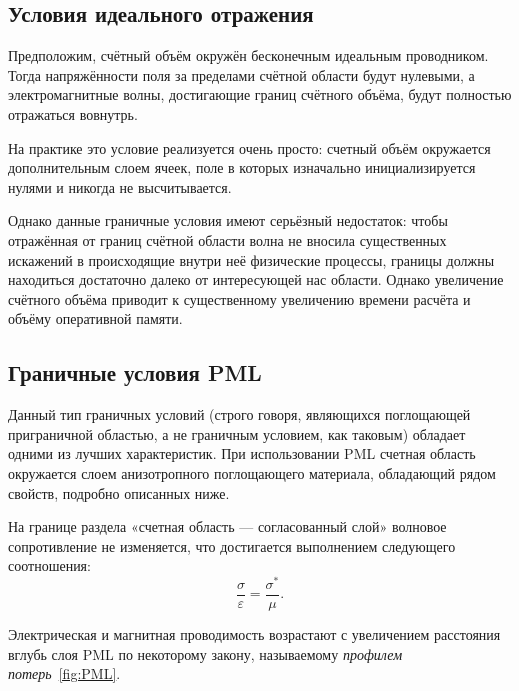 \subsection{Условия идеального отражения}

Предположим, счётный объём окружён бесконечным идеальным проводником. Тогда 
напряжённости поля за пределами счётной области будут нулевыми, а 
электромагнитные волны, достигающие границ счётного объёма, будут полностью отражаться вовнутрь.

На практике это условие реализуется очень просто: счетный объём окружается
дополнительным слоем ячеек, поле в которых изначально
инициализируется нулями и никогда не высчитывается.

Однако данные граничные условия имеют серьёзный недостаток: чтобы отражённая от 
границ счётной области волна не вносила существенных искажений в происходящие внутри неё физические процессы, границы должны находиться достаточно далеко от интересующей нас области. Однако увеличение счётного объёма приводит к 
существенному увеличению времени расчёта и объёму оперативной памяти.

\subsection{Граничные условия PML}

Данный тип граничных условий (строго говоря, являющихся поглощающей приграничной областью, а не граничным условием, как таковым) обладает одними из лучших
характеристик. При использовании PML счетная область
окружается слоем анизотропного поглощающего материала, обладающий рядом свойств,
подробно описанных ниже.

На границе раздела «счетная область --- согласованный слой» волновое
сопротивление не изменяется, что достигается выполнением следующего соотношения:
\begin{equation}
\label{eq:EpsilonAndMu}
\frac{\sigma}{\varepsilon} = \frac{\sigma^*}{\mu}.
\end{equation}


Электрическая и магнитная проводимость возрастают с увеличением расстояния
вглубь слоя PML по некоторому закону, называемому \emph{профилем потерь}~\ref{fig:PML}.

